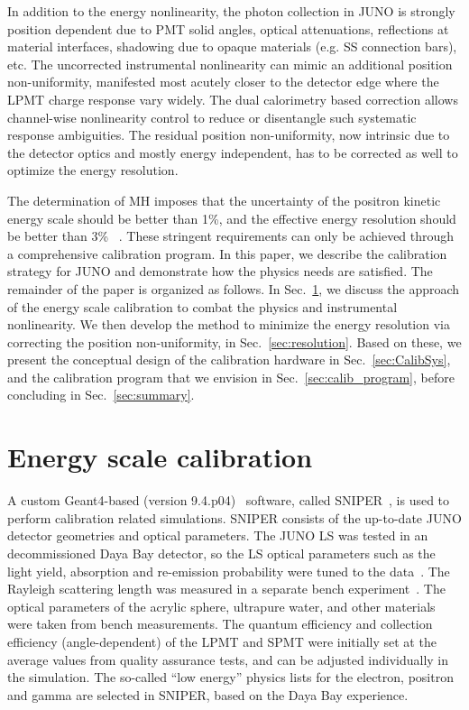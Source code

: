 \documentclass[a4paper,10pt,twoside]{cpc-hepnp}
\begin{document}
\begin{CJK*}{GB}{gbsn}
\begin{multicols}{2}
In addition to the energy nonlinearity, the photon collection in JUNO
is strongly position dependent due to PMT solid angles, optical
attenuations, reflections at material interfaces, shadowing due to
opaque materials (e.g. SS connection bars), etc.  
  The uncorrected instrumental nonlinearity can mimic an additional
  position non-uniformity, manifested most acutely closer to the
  detector edge where the LPMT charge response vary widely. The dual
  calorimetry based correction allows channel-wise nonlinearity
  control to reduce or disentangle such systematic response
  ambiguities. The residual position non-uniformity, now intrinsic
due to the detector optics and mostly energy independent, has to be
corrected as well to optimize the energy resolution.

The determination of MH imposes that the uncertainty of the positron
kinetic energy scale should be better than 1\%, and the effective
energy resolution should be better than 3\%
~\cite{zhanliang-original-paper-2009,zhanliang-original-paper-2013,yellow-book}.
These stringent requirements can only be achieved through a
comprehensive calibration program. In this paper, we describe the
calibration strategy for JUNO and demonstrate how the physics needs are satisfied. 
The remainder of the paper is organized as follows. In
{Sec.~\ref{sec:scale_calib}}, we discuss the approach of the energy
scale calibration to combat the physics and instrumental
nonlinearity. 
We then develop the method to minimize the energy
resolution via correcting the position non-uniformity,
in {Sec.~\ref{sec:resolution}}.  Based on these, we present the
conceptual design of the calibration hardware in
{Sec.~\ref{sec:CalibSys}}, and the calibration program that we
envision in {Sec.~\ref{sec:calib_program}}, before concluding in
{Sec.~\ref{sec:summary}}.

\section{Energy scale calibration}
\label{sec:scale_calib}
A custom Geant4-based (version 9.4.p04)~\cite{Geant4} software, called
SNIPER~\cite{SNIPER}, is used to perform calibration related
simulations. SNIPER consists of the up-to-date JUNO detector
geometries and optical parameters. The JUNO LS was
  tested in an decommissioned Daya Bay detector, so the LS optical
  parameters such as the light yield, absorption and re-emission
  probability were tuned to the data~\cite{YuZeyuan_LSpaper,
    JUNOLSAbsL}. The Rayleigh scattering length was measured in a
  separate bench experiment~\cite{Zhouxiang_Paper}. The optical parameters of the
  acrylic sphere, ultrapure water, and other materials were taken from
  bench measurements. The quantum efficiency and collection efficiency
  (angle-dependent) of the LPMT and SPMT were initially set at the
  average values from quality assurance tests, and can be adjusted
  individually in the simulation. The so-called ``low energy'' physics
  lists for the electron, positron and gamma are selected in SNIPER,
  based on the Daya Bay experience.


\end{multicols}
\end{CJK*}
\end{document}

